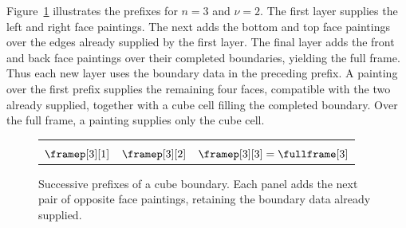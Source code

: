 \documentclass[a4paper,UKenglish,cleveref,autoref]{lipics-v2021}
\begin{document}
Figure~\ref{fig:cube-prefixes} illustrates the prefixes for $n=3$ and $\nu=2$. The first layer supplies the left and right face paintings. The next adds the bottom and top face paintings over the edges already supplied by the first layer. The final layer adds the front and back face paintings over their completed boundaries, yielding the full frame. Thus each new layer uses the boundary data in the preceding prefix. A painting over the first prefix supplies the remaining four faces, compatible with the two already supplied, together with a cube cell filling the completed boundary. Over the full frame, a painting supplies only the cube cell.

\begin{figure}[tbp]
  \centering
  \begingroup
  
  \begin{tabularx}{\linewidth}{YYY}
    \cubePicture{\cubeLastLayerFirst}                     &
    \cubePicture{\cubeLastLayerFirst\cubeLastLayerSecond} &
    \cubePicture{\cubeLastLayerFirst\cubeLastLayerSecond\cubeLastLayerThird}                                \\\addlinespace[0.6em]
    $\framep[3][1]$                                       & $\framep[3][2]$ & $\framep[3][3]=\fullframe[3]$
  \end{tabularx}
  \endgroup
  \caption{Successive prefixes of a cube boundary. Each panel adds the next pair of opposite face paintings, retaining the boundary data already supplied.}
  \label{fig:cube-prefixes}
\end{figure}
\end{document}
